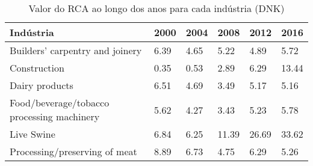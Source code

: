 \begin{table}
\centering
\caption{Valor do RCA ao longo dos anos para cada indústria (DNK)}
\label{tab:ex3-tempo-DNK}
\begin{tabular}{p{6cm}p{1.5cm}p{1.5cm}p{1.5cm}p{1.5cm}p{1.5cm}}
\toprule
                                 Indústria & 2000 & 2004 &  2008 &  2012 &  2016 \\
\midrule
           Builders' carpentry and joinery & 6.39 & 4.65 &  5.22 &  4.89 &  5.72 \\
                              Construction & 0.35 & 0.53 &  2.89 &  6.29 & 13.44 \\
                            Dairy products & 6.51 & 4.69 &  3.49 &  5.17 &  5.16 \\
Food/beverage/tobacco processing machinery & 5.62 & 4.27 &  3.43 &  5.23 &  5.78 \\
                                Live Swine & 6.84 & 6.25 & 11.39 & 26.69 & 33.62 \\
             Processing/preserving of meat & 8.89 & 6.73 &  4.75 &  6.29 &  5.26 \\
\bottomrule
\end{tabular}
\end{table}
